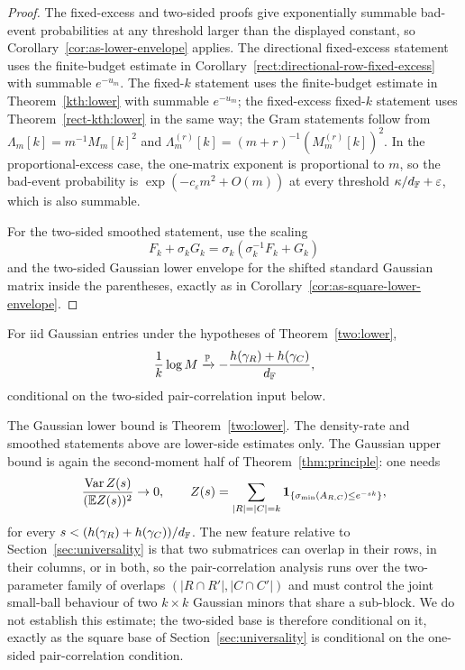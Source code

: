 \begin{proof}
The fixed-excess and two-sided proofs give exponentially summable bad-event
probabilities at any threshold larger than the displayed constant, so
Corollary~\ref{cor:as-lower-envelope} applies.  The directional fixed-excess
statement uses the finite-budget estimate in
Corollary~\ref{rect:directional-row-fixed-excess} with summable \(e^{-u_m}\).
The fixed-\(k\) statement uses the finite-budget estimate in
Theorem~\ref{kth:lower} with summable \(e^{-u_m}\); the fixed-excess
fixed-\(k\) statement uses Theorem~\ref{rect-kth:lower} in the same way; the
Gram statements follow from
\(\Lambda_m[k]=m^{-1}M_m[k]^2\) and
\(\Lambda_m^{(r)}[k]=(m+r)^{-1}(M_m^{(r)}[k])^2\).  In the
proportional-excess case, the
one-matrix exponent is proportional to \(m\), so the bad-event probability is
\(\exp(-c_\varepsilon m^2+O(m))\) at every threshold
\(\kappa/d_{\mathbb{F}}+\varepsilon\), which is also summable.

For the two-sided smoothed statement, use the scaling
\[
  F_k+\sigma_kG_k=\sigma_k(\sigma_k^{-1}F_k+G_k)
\]
and the two-sided Gaussian lower envelope for the shifted standard Gaussian
matrix inside the parentheses, exactly as in
Corollary~\ref{cor:as-square-lower-envelope}.
\end{proof}

\begin{conjecture}\label{two:exact}
For iid Gaussian entries under the hypotheses of Theorem~\ref{two:lower},
\[
  \frac1k\log M\xrightarrow{\mathbb{P}}-\frac{h(\gamma_R)+h(\gamma_C)}{d_{\mathbb{F}}},
\]
conditional on the two-sided pair-correlation input below.
\end{conjecture}

The Gaussian lower bound is Theorem~\ref{two:lower}.  The density-rate and
smoothed statements above are lower-side estimates only.  The Gaussian upper
bound is again the second-moment half of Theorem~\ref{thm:principle}: one needs
\[
  \frac{\operatorname{Var} Z(s)}{(\mathbb{E} Z(s))^2}\to0,
  \qquad
  Z(s)=\sum_{|R|=|C|=k}\mathbf{1}_{\{\sigma_{\min}(A_{R,C})\le e^{-sk}\}},
\]
for every \(s<(h(\gamma_R)+h(\gamma_C))/d_{\mathbb{F}}\).  The new feature relative to
Section~\ref{sec:universality} is that two submatrices can overlap in their rows,
in their columns, or in both, so the pair-correlation analysis runs over the
two-parameter family of overlaps \((|R\cap R'|,|C\cap C'|)\) and must control the
joint small-ball behaviour of two \(k\times k\) Gaussian minors that share a
sub-block.  We do not establish this estimate; the two-sided base is therefore
conditional on it, exactly as the square base of Section~\ref{sec:universality}
is conditional on the one-sided pair-correlation condition.

